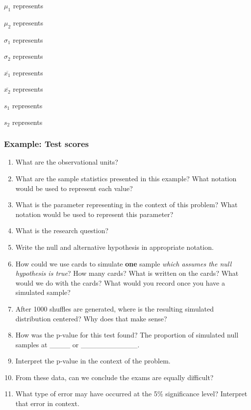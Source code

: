 \documentclass[
]{report}
\newcommand{\rgs}{\vspace{12pt}} %
\begin{document}
\(\mu_1\) represents
\rgs

\(\mu_2\) represents
\rgs

\(\sigma_1\) represents
\rgs

\(\sigma_2\) represents
\rgs

\(\overline{x_1}\) represents
\rgs

\(\overline{x_2}\) represents
\rgs

\(s_1\) represents
\rgs

\(s_2\) represents
\rgs

\hypertarget{example-test-scores}{%
\subsubsection*{Example: Test scores}\label{example-test-scores}}

\begin{enumerate}
\def\labelenumi{\arabic{enumi}.}
\item
  What are the observational units?
  \rgs
\item
  What are the sample statistics presented in this example? What notation would be used to represent each value?
  \rgs
\item
  What is the parameter representing in the context of this problem? What notation would be used to represent this parameter?
  \rgs
  \rgs
\item
  What is the research question?
  \rgs
\item
  Write the null and alternative hypothesis in appropriate notation.
  \rgs
\item
  How could we use cards to simulate \textbf{one} sample \emph{which assumes the null hypothesis is true}? How many cards? What is written on the cards? What would we do with the cards? What would you record once you have a simulated sample?
  \rgs
  \rgs
  \rgs
\item
  After 1000 shuffles are generated, where is the resulting simulated distribution centered? Why does that make sense?
  \rgs
  \rgs
\item
  How was the p-value for this test found? The proportion of simulated null samples at \_\_\_\_ or \_\_\_\_\_\_\_\_\_\_\_.
  \rgs
\item
  Interpret the p-value in the context of the problem.
  \rgs
  \rgs
\item
  From these data, can we conclude the exams are equally difficult?
  \rgs
\item
  What type of error may have occurred at the 5\% significance level? Interpret that error in context.
  \rgs
  \rgs
\end{enumerate}
\end{document}
